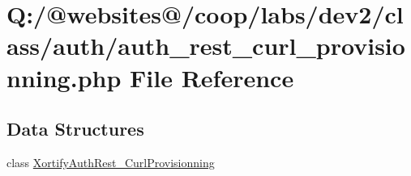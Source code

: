 \hypertarget{auth__rest__curl__provisionning_8php}{\section{Q\-:/@websites@/coop/labs/dev2/class/auth/auth\-\_\-rest\-\_\-curl\-\_\-provisionning.php File Reference}
\label{auth__rest__curl__provisionning_8php}
}
\subsection*{Data Structures}
\begin{DoxyCompactItemize}
\item 
class \hyperlink{class_xortify_auth_rest___curl_provisionning}{Xortify\-Auth\-Rest\-\_\-\-Curl\-Provisionning}
\end{DoxyCompactItemize}
